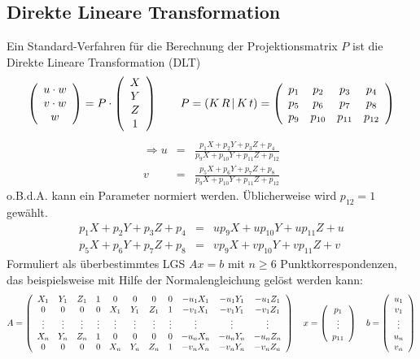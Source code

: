 \subsection{Direkte Lineare Transformation}

Ein Standard-Verfahren für die Berechnung der Projektionsmatrix $P$ ist die Direkte Lineare Transformation (DLT)
$$\left( \begin{array}{c} u \cdot w \\ v \cdot w \\ w \end{array} \right) = P \cdot \left( \begin{array}{c} X \\ Y \\ Z \\ 1 \end{array} \right) \qquad P = (K \, R \, | \, K \, t) = \left( \begin{array}{cccc} p_1 & p_2 & p_3 & p_4 \\ p_5 & p_6 & p_7 & p_8 \\ p_9 & p_{10} & p_{11} & p_{12} \end{array} \right)$$
\begin{eqnarray*}
\Rightarrow u &=& \frac{p_1X + p_2Y + p_3Z + p_4}{p_9X + p_{10}Y + p_{11}Z + p_{12}} \\
v &=& \frac{p_5X + p_6Y + p_7Z + p_8}{p_9X + p_{10}Y + p_{11}Z + p_{12}}
\end{eqnarray*}
o.B.d.A. kann ein Parameter normiert werden. Üblicherweise wird $p_{12} = 1$ gewählt.
\begin{eqnarray*}
p_1X + p_2Y + p_3Z + p_4 &=& up_9X + up_{10}Y + up_{11}Z + u \\
p_5X + p_6Y + p_7Z + p_8 &=& vp_9X + vp_{10}Y + vp_{11}Z + v
\end{eqnarray*}
Formuliert als überbestimmtes LGS $Ax = b$ mit $n \geq 6$ Punktkorrespondenzen, das beispielsweise mit Hilfe der Normalengleichung gelöst werden kann:
$$A = \left( \begin{array}{ccccccccccc} X_1 & Y_1 & Z_1 & 1 & 0 & 0 & 0 & 0 & -u_1X_1 & -u_1Y_1 & -u_1Z_1 \\ 0 & 0 & 0 & 0 & X_1 & Y_1 & Z_1 & 1 & -v_1X_1 & -v_1Y_1 & -v_1Z_1 \\ \vdots & \vdots & \vdots & \vdots & \vdots & \vdots & \vdots & \vdots & \vdots & \vdots & \vdots \\ X_n & Y_n & Z_n & 1 & 0 & 0 & 0 & 0 & -u_nX_n & -u_nY_n & -u_nZ_n \\ 0 & 0 & 0 & 0 & X_n & Y_n & Z_n & 1 & -v_nX_n & -v_nY_n & -v_nZ_n \end{array} \right) \quad x = \left( \begin{array}{c} p_1 \\ \vdots \\ p_{11} \end{array} \right) \quad b = \left( \begin{array}{c} u_1 \\ v_1 \\ \vdots \\ u_n \\ v_n \end{array} \right)$$

